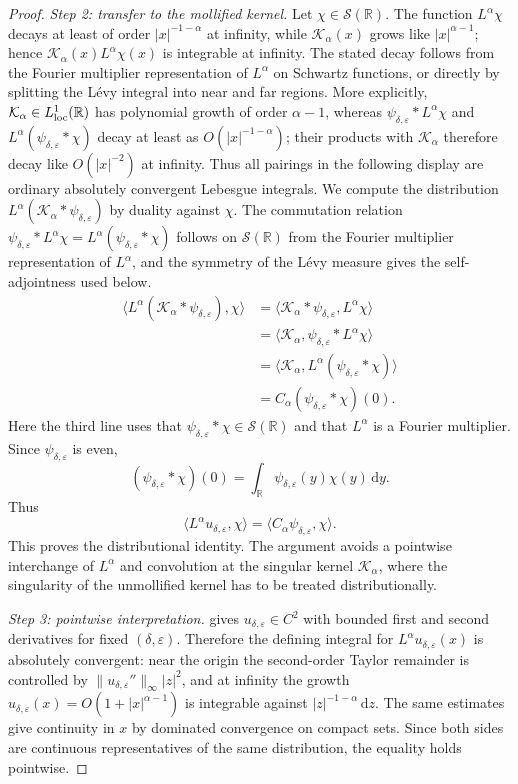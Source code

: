 \documentclass[11pt]{article}
\newcommand{\R}{\mathbb{R}}
\newcommand{\1}{\mathbf{1}}
\newcommand{\dd}{\,\mathrm{d}}
\newcommand{\eps}{\varepsilon}
\newcommand{\RieszK}{\mathcal K_\alpha}
\begin{document}
\begin{proof}
\emph{Step 2: transfer to the mollified kernel.} Let $\chi\in\mathcal S(\R)$. The function $L^\alpha\chi$ decays at least of order $|x|^{-1-\alpha}$ at infinity, while $\RieszK(x)$ grows like $|x|^{\alpha-1}$; hence $\RieszK(x)L^\alpha\chi(x)$ is integrable at infinity. The stated decay follows from the Fourier multiplier representation of $L^\alpha$ on Schwartz functions, or directly by splitting the L\'evy integral into near and far regions. More explicitly, $\RieszK\in L^1_{\rm loc}(\R)$ has polynomial growth of order $\alpha-1$, whereas $\psi_{\delta,\eps}*L^\alpha\chi$ and $L^\alpha(\psi_{\delta,\eps}*\chi)$ decay at least as $O(|x|^{-1-\alpha})$; their products with $\RieszK$ therefore decay like $O(|x|^{-2})$ at infinity. Thus all pairings in the following display are ordinary absolutely convergent Lebesgue integrals. We compute the distribution $L^\alpha(\RieszK*\psi_{\delta,\eps})$ by duality against $\chi$. The commutation relation $\psi_{\delta,\eps}*L^\alpha\chi=L^\alpha(\psi_{\delta,\eps}*\chi)$ follows on $\mathcal S(\R)$ from the Fourier multiplier representation of $L^\alpha$, and the symmetry of the L\'evy measure gives the self-adjointness used below.
\begin{align*}
\langle L^\alpha(\RieszK*\psi_{\delta,\eps}),\chi\rangle
&=\langle \RieszK*\psi_{\delta,\eps},L^\alpha\chi\rangle\\
&=\langle \RieszK,\psi_{\delta,\eps}*L^\alpha\chi\rangle\\
&=\langle \RieszK,L^\alpha(\psi_{\delta,\eps}*\chi)\rangle\\
&=C_\alpha(\psi_{\delta,\eps}*\chi)(0).
\end{align*}
Here the third line uses that $\psi_{\delta,\eps}*\chi\in\mathcal S(\R)$ and that $L^\alpha$ is a Fourier multiplier. Since $\psi_{\delta,\eps}$ is even,
\[
  (\psi_{\delta,\eps}*\chi)(0)=\int_{\R}\psi_{\delta,\eps}(y)\chi(y)\dd y.
\]
Thus
\[
  \langle L^\alpha u_{\delta,\eps},\chi\rangle
  =\langle C_\alpha\psi_{\delta,\eps},\chi\rangle.
\]
This proves the distributional identity. The argument avoids a pointwise interchange of $L^\alpha$ and convolution at the singular kernel $\RieszK$, where the singularity of the unmollified kernel has to be treated distributionally.

\emph{Step 3: pointwise interpretation.}  gives $u_{\delta,\eps}\in C^2$ with bounded first and second derivatives for fixed $(\delta,\eps)$. Therefore the defining integral for $L^\alpha u_{\delta,\eps}(x)$ is absolutely convergent: near the origin the second-order Taylor remainder is controlled by $\|u_{\delta,\eps}''\|_\infty |z|^2$, and at infinity the growth $u_{\delta,\eps}(x)=O(1+|x|^{\alpha-1})$ is integrable against $|z|^{-1-\alpha}\dd z$. The same estimates give continuity in $x$ by dominated convergence on compact sets. Since both sides are continuous representatives of the same distribution, the equality holds pointwise.


\end{proof}
\end{document}
